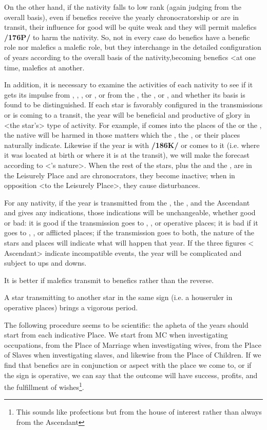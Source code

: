 On the other hand, if the nativity falls to low rank (again judging from the overall basis), even if benefics receive the yearly chronocratorship or are in transit, their influence for good will be quite weak and they will permit malefics \textbf{/176P/} to harm the nativity. \mnbm So, not in every case do benefics have a benefic role nor  malefics a malefic role, but they \mnmb interchange in the detailed configuration of years according to the overall basis of the nativity,becoming benefics <at one time, malefics at another.

In addition, it is necessary to examine the activities of each nativity to see if it gets its impulse from \Mercury, \Mars, \Venus, or \Saturn, or from the \Sun, the \Moon, or \Jupiter, and whether its basis is found to be distinguished. If each star is favorably configured in the transmissions or is coming to a transit, the year will be beneficial and productive of glory in <the star’s> type of activity. For example, if \Saturn\xspace comes into the places of the \Sun\xspace or the \Moon, the native will be harmed in those matters which the \Sun, the \Moon, or their places naturally indicate. Likewise if the year is with \Saturn\xspace \textbf{/186K/} or comes to it (i.e. where it was located at birth or where it is at the transit), we will make the forecast according to <\Saturn’s
nature>. When the rest of the stars, plus the \Sun\xspace and the \Moon, are in the Leisurely Place and are chronocrators, they become inactive; when in opposition <to the Leisurely Place>, they cause disturbances.

For any nativity, if the year is transmitted from the \Sun, the \Moon, and the Ascendant and gives any indications, those indications will be unchangeable, whether good or bad: it is good if the transmission goes to \Venus, \Jupiter, or operative places; it is bad if it goes to \Saturn, \Mars, or afflicted places; if the transmission goes to both, the nature of the stars and places will indicate what will happen that year. If the three figures <\Sun\xspace \Moon\xspace Ascendant> indicate incompatible events, the year will be complicated and
subject to ups and downs. 

It is better if malefics transmit to benefics rather than the reverse. 

A star transmitting to another star in the same sign (i.e. a houseruler in operative places) brings a vigorous period.

The following procedure seems to be scientific: the apheta of the years should start from each indicative Place. We start from MC when investigating occupations, from the Place of Marriage when investigating wives, from the Place of Slaves when investigating slaves, and likewise from the Place of Children. If we find that benefics are in conjunction or aspect with the place we come to, or if the sign is operative, we can
say that the outcome will have success, profits, and the fulfillment of wishes\footnote{This sounds like profections but from the house of interest rather than always from the Ascendant}.

